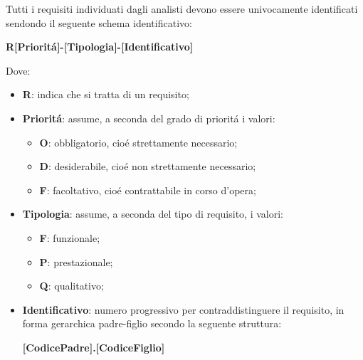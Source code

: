 Tutti i requisiti individuati dagli analisti devono essere univocamente identificati sendondo il seguente schema identificativo:

\begin{center}
    \textbf{R[Priorit\'{a}]-[Tipologia]-[Identificativo]}
\end{center}

Dove:

\begin{itemize}
    \item \textbf{R}: indica che si tratta di un requisito;
    \item \textbf{Priorit\'{a}}: assume, a seconda del grado di priorit\'{a} i valori:
    \begin{itemize}
        \item \textbf{O}: obbligatorio, cio\'{e} strettamente necessario;
        \item \textbf{D}: desiderabile, cio\'{e} non strettamente necessario;
        \item \textbf{F}: facoltativo, cio\'{e} contrattabile in corso d'opera;
    \end{itemize}
    \item \textbf{Tipologia}: assume, a seconda del tipo di requisito, i valori:
    \begin{itemize}
        \item \textbf{F}: funzionale;
        \item \textbf{P}: prestazionale;
        \item \textbf{Q}: qualitativo;
    \end{itemize}
    \item \textbf{Identificativo}: numero progressivo per contraddistinguere il requisito, in forma gerarchica padre-figlio secondo la seguente struttura:
    \begin{center}
        \textbf{[CodicePadre].[CodiceFiglio]}
    \end{center}
\end{itemize}